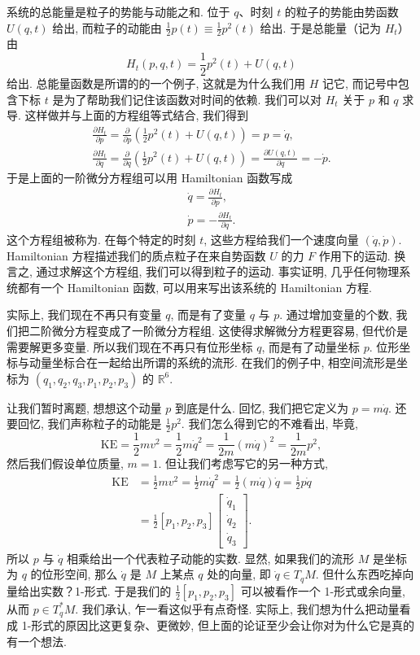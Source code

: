 系统的总能量是粒子的势能与动能之和. 位于 $q$、时刻 $t$ 的粒子的势能由势函数 $U(q,t)$ 给出, 而粒子的动能由 $\frac{1}{2}p(t)\equiv\frac{1}{2}p^2(t)$ 给出. 于是总能量（记为 $H_t$）由
\[
H_t(p,q,t)=\frac{1}{2}p^2(t)+U(q,t)
\]
给出. 总能量函数是所谓的的一个例子, 这就是为什么我们用 $H$ 记它, 而记号中包含下标 $t$ 是为了帮助我们记住该函数对时间的依赖. 我们可以对 $H_t$ 关于 $p$ 和 $q$ 求导. 这样做并与上面的方程组等式结合, 我们得到
\begin{align*}
\frac{\partial H_t}{\partial p}=\frac{\partial}{\partial p}\left(\frac{1}{2}p^2(t)+U(q,t)\right)=p=\dot{q}, \\
\frac{\partial H_t}{\partial q}=\frac{\partial}{\partial q}\left(\frac{1}{2}p^2(t)+U(q,t)\right)=\frac{\partial U(q,t)}{\partial q}=-\dot{p}.
\end{align*}
于是上面的一阶微分方程组可以用 Hamiltonian 函数写成
\begin{align*}
\dot{q}=\frac{\partial H_t}{\partial p}, \\
\dot{p}=-\frac{\partial H_t}{\partial q}.
\end{align*}
这个方程组被称为. 在每个特定的时刻 $t$, 这些方程给我们一个速度向量 $(\dot{q},\dot{p})$. Hamiltonian 方程描述我们的质点粒子在来自势函数 $U$ 的力 $F$ 作用下的运动. 换言之, 通过求解这个方程组, 我们可以得到粒子的运动. 事实证明, 几乎任何物理系统都有一个 Hamiltonian 函数, 可以用来写出该系统的 Hamiltonian 方程.

实际上, 我们现在不再只有变量 $q$, 而是有了变量 $q$ 与 $p$. 通过增加变量的个数, 我们把二阶微分方程变成了一阶微分方程组. 这使得求解微分方程更容易, 但代价是需要解更多变量. 所以我们现在不再只有位形坐标 $q$, 而是有了动量坐标 $p$. 位形坐标与动量坐标合在一起给出所谓的系统的流形. 在我们的例子中, 相空间流形是坐标为 $(q_1,q_2,q_3,p_1,p_2,p_3)$ 的 $\mathbb{R}^6$.

让我们暂时离题, 想想这个动量 $p$ 到底是什么. 回忆, 我们把它定义为 $p=m\dot{q}$. 还要回忆, 我们声称粒子的动能是 $\frac{1}{2}p^2$. 我们怎么得到它的不难看出, 毕竟, 
\[
\mathrm{KE}=\frac{1}{2}mv^2=\frac{1}{2}m\dot{q}^2=\frac{1}{2m}(m\dot{q})^2=\frac{1}{2m}p^2,
\]
然后我们假设单位质量, $m=1$. 但让我们考虑写它的另一种方式, 
\[
\begin{aligned}
\mathrm{KE}&=\frac{1}{2}mv^2=\frac{1}{2}m\dot{q}^2=\frac{1}{2}(m\dot{q})\dot{q}=\frac{1}{2}p\dot{q}\\
&=\frac{1}{2}[p_1,p_2,p_3]\begin{bmatrix}\dot{q}_1\\\dot{q}_2\\\dot{q}_3\end{bmatrix}.
\end{aligned}
\]
所以 $p$ 与 $\dot{q}$ 相乘给出一个代表粒子动能的实数. 显然, 如果我们的流形 $M$ 是坐标为 $q$ 的位形空间, 那么 $\dot{q}$ 是 $M$ 上某点 $q$ 处的向量, 即 $\dot{q}\in T_qM$. 但什么东西吃掉向量给出实数？1-形式. 于是我们的 $\frac{1}{2}[p_1,p_2,p_3]$ 可以被看作一个 1-形式或余向量, 从而 $p\in T_q^*M$. 我们承认, 乍一看这似乎有点奇怪. 实际上, 我们想为什么把动量看成 1-形式的原因比这更复杂、更微妙, 但上面的论证至少会让你对为什么它是真的有一个想法.

